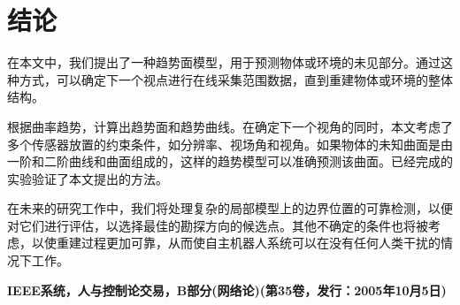 \documentclass[AutoFakeBold,zihao=-4]{ctexart}
\begin{document}
	\section{结论}
	在本文中，我们提出了一种趋势面模型，用于预测物体或环境的未见部分。通过这种方式，可以确定下一个视点进行在线采集范围数据，直到重建物体或环境的整体结构。
	
	根据曲率趋势，计算出趋势面和趋势曲线。在确定下一个视角的同时，本文考虑了多个传感器放置的约束条件，如分辨率、视场角和视角。如果物体的未知曲面是由一阶和二阶曲线和曲面组成的，这样的趋势模型可以准确预测该曲面。已经完成的实验验证了本文提出的方法。
	
	在未来的研究工作中，我们将处理复杂的局部模型上的边界位置的可靠检测，以便对它们进行评估，以选择最佳的勘探方向的候选点。其他不确定的条件也将被考虑，以使重建过程更加可靠，从而使自主机器人系统可以在没有任何人类干扰的情况下工作。
	
	\begin{flushright}
		\songti {} \bfseries IEEE系统，人与控制论交易，B部分(网络论)(第35卷，发行：2005年10月5日)
	\end{flushright}

	\newpage
	
	\nocite{*}
	
\end{document}
